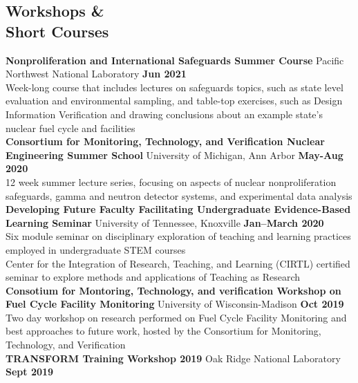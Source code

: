 \documentclass[margin,line]{resume}
\begin{document}
\begin{resume}
    \section{\mysidestyle Workshops \&\\Short Courses}
    \textbf{Nonproliferation and International Safeguards Summer Course} Pacific Northwest National Laboratory \hfill \textbf{Jun 2021} \\
    Week-long course that includes lectures on safeguards topics, such as state level evaluation and environmental sampling, and 
    table-top exercises, such as Design Information Verification and drawing conclusions about an example state's nuclear 
    fuel cycle and facilities \\
    \textbf{Consortium for Monitoring, Technology, and Verification Nuclear Engineering Summer School} University of Michigan, Ann Arbor \hfill \textbf{May-Aug 2020} \\
    12 week summer lecture series, focusing on aspects of nuclear nonproliferation safeguards, gamma and neutron detector systems, and experimental data analysis \\
    \textbf{Developing Future Faculty Facilitating Undergraduate Evidence-Based Learning Seminar} University of Tennessee, Knoxville \hfill \textbf{Jan--March 2020} \\
    Six module seminar on disciplinary exploration of teaching and learning practices employed in undergraduate STEM courses \\
    Center for the Integration of Research, Teaching, and Learning (CIRTL) certified seminar to explore methods and applications of Teaching as Research\\
    \textbf{Consotium for Montoring, Technology, and verification Workshop on Fuel Cycle Facility Monitoring} University of Wisconsin-Madison \hfill \textbf{Oct 2019} \\
    Two day workshop on research performed on Fuel Cycle Facility Monitoring and best approaches to future work, hosted by the Consortium for Monitoring, Technology, and Verification \\
    \textbf{TRANSFORM Training Workshop 2019} Oak Ridge National Laboratory \hfill \textbf{Sept 2019} \\

\end{resume}
\end{document}

